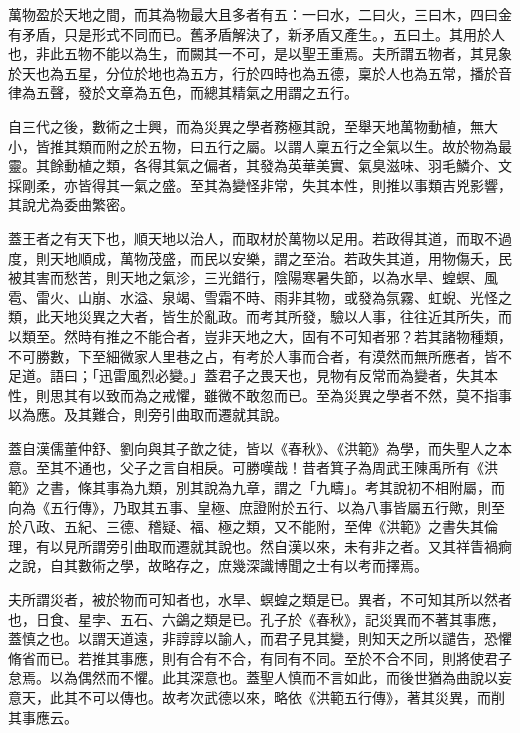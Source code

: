 
\begin{pinyinscope}

 萬物盈於天地之間，而其為物最大且多者有五：一曰水，二曰火，三曰木，四曰金有矛盾，只是形式不同而已。舊矛盾解決了，新矛盾又產生。，五曰土。其用於人也，非此五物不能以為生，而闕其一不可，是以聖王重焉。夫所謂五物者，其見象於天也為五星，分位於地也為五方，行於四時也為五德，稟於人也為五常，播於音律為五聲，發於文章為五色，而總其精氣之用謂之五行。



 自三代之後，數術之士興，而為災異之學者務極其說，至舉天地萬物動植，無大小，皆推其類而附之於五物，曰五行之屬。以謂人稟五行之全氣以生。故於物為最靈。其餘動植之類，各得其氣之偏者，其發為英華美實、氣臭滋味、羽毛鱗介、文採剛柔，亦皆得其一氣之盛。至其為變怪非常，失其本性，則推以事類吉兇影響，其說尤為委曲繁密。



 蓋王者之有天下也，順天地以治人，而取材於萬物以足用。若政得其道，而取不過度，則天地順成，萬物茂盛，而民以安樂，謂之至治。若政失其道，用物傷夭，民被其害而愁苦，則天地之氣沴，三光錯行，陰陽寒暑失節，以為水旱、蝗螟、風雹、雷火、山崩、水溢、泉竭、雪霜不時、雨非其物，或發為氛霧、虹蜺、光怪之類，此天地災異之大者，皆生於亂政。而考其所發，驗以人事，往往近其所失，而以類至。然時有推之不能合者，豈非天地之大，固有不可知者邪？若其諸物種類，不可勝數，下至細微家人里巷之占，有考於人事而合者，有漠然而無所應者，皆不足道。語曰；「迅雷風烈必變。」蓋君子之畏天也，見物有反常而為變者，失其本性，則思其有以致而為之戒懼，雖微不敢忽而已。至為災異之學者不然，莫不指事以為應。及其難合，則旁引曲取而遷就其說。



 蓋自漢儒董仲舒、劉向與其子歆之徒，皆以《春秋》、《洪範》為學，而失聖人之本意。至其不通也，父子之言自相戾。可勝嘆哉！昔者箕子為周武王陳禹所有《洪範》之書，條其事為九類，別其說為九章，謂之「九疇」。考其說初不相附屬，而向為《五行傳》，乃取其五事、皇極、庶證附於五行、以為八事皆屬五行歟，則至於八政、五紀、三德、稽疑、福、極之類，又不能附，至俾《洪範》之書失其倫理，有以見所謂旁引曲取而遷就其說也。然自漢以來，未有非之者。又其祥眚禍痾之說，自其數術之學，故略存之，庶幾深識博聞之士有以考而擇焉。



 夫所謂災者，被於物而可知者也，水旱、螟蝗之類是已。異者，不可知其所以然者也，日食、星孛、五石、六鷁之類是已。孔子於《春秋》，記災異而不著其事應，蓋慎之也。以謂天道遠，非諄諄以諭人，而君子見其變，則知天之所以譴告，恐懼脩省而已。若推其事應，則有合有不合，有同有不同。至於不合不同，則將使君子怠焉。以為偶然而不懼。此其深意也。蓋聖人慎而不言如此，而後世猶為曲說以妄意天，此其不可以傳也。故考次武德以來，略依《洪範五行傳》，著其災異，而削其事應云。




\end{pinyinscope}
